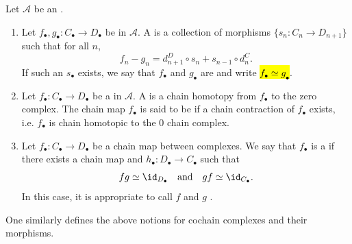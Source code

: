 
\begin{definition} \label{definition:chain_homotopy_between_chain_maps_between_complexes}
Let $\mathcal{A}$ be an . 
\begin{enumerate}

    \item Let $f_\bullet, g_\bullet: C_\bullet \to D_\bullet$ be  in $\mathcal{A}$. A  is a collection of morphisms $\{ s_n : C_n \to D_{n+1} \}$ such that for all $n$,
    \[
    f_n - g_n = d_{n+1}^D \circ s_n + s_{n-1} \circ d_n^C.
    \]
    If such an $s_\bullet$ exists, we say that $f_\bullet$ and $g_\bullet$ are  and write \hl{$f_\bullet \simeq g_\bullet$}.

    \item Let $f_\bullet: C_\bullet \to D_\bullet$ be a  in $\mathcal{A}$. A  is a chain homotopy from $f_\bullet$ to the zero complex. The chain map $f_\bullet$ is said to be  if a chain contraction of $f_\bullet$ exists, i.e. $f_\bullet$ is chain homotopic to the $0$ chain complex. 

    \item Let $f_\bullet: C_\bullet \to D_\bullet$ be a chain map between complexes. We say that $f_\bullet$ is a  if there exists a chain map and $h_\bullet: D_\bullet \to C_\bullet$ such that
    $$fg \simeq \id_{D_\bullet} \quad \text{and} \quad gf \simeq \id_{C_\bullet}.$$
    In this case, it is appropriate to call $f$ and $g$ .
\end{enumerate}
One similarly defines the above notions for cochain complexes and their morphisms.
\end{definition}

